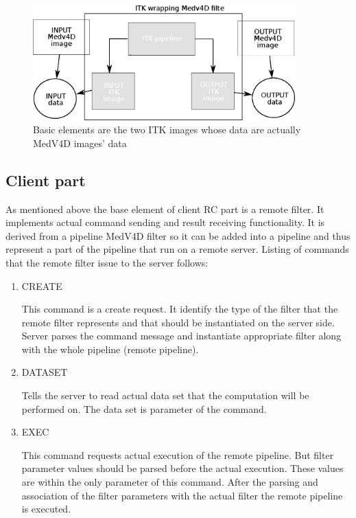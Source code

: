 \begin{figure}
    \centering
    \includegraphics[width=0.9\textwidth]{data/ITKFilter}
    \caption[ITK wrapper MedV4D filter]{Basic elements are the two ITK images whose data are actually MedV4D images' data}
    \label{fg:ITKWrapping}
\end{figure}

\subsection{Client part}

As mentioned above the base element of client RC part is a remote filter.
It implements actual command sending and result receiving functionality.
It is derived from a pipeline MedV4D filter so it can be added into a pipeline and thus represent a part of the pipeline that run on a remote server.
Listing of commands that the remote filter issue to the server follows:
\begin{enumerate}
  \item{CREATE}
  \par
  This command is a create request.
It identify the type of the filter that the remote filter represents and that should be instantiated on the server side.
Server parses the command message and instantiate appropriate filter along with the whole pipeline (remote pipeline).

  \item{DATASET}
  \par
  Tells the server to read actual data set that the computation will be performed on.
The data set is parameter of the command.

  \item{EXEC}
\par
  This command requests actual execution of the remote pipeline.
But filter parameter values should be parsed before the actual execution.
These values are within the only parameter of this command.
After the parsing and association of the filter parameters with the actual filter the remote pipeline is executed.
\end{enumerate}

